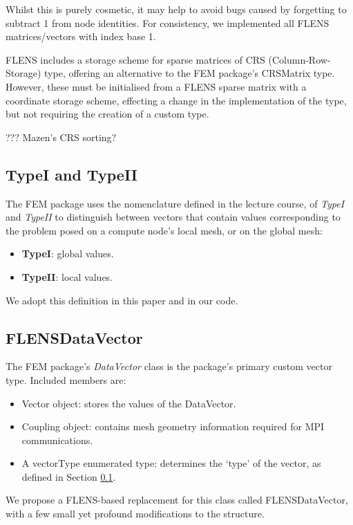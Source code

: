 Whilst this is purely cosmetic, it may help to avoid bugs caused by forgetting to subtract 1 from node identities. For consistency, we implemented all FLENS matrices/vectors with index base 1.

FLENS includes a storage scheme for sparse matrices of CRS (Column-Row-Storage) type, offering an alternative to the FEM package's CRSMatrix type. However, these must be initialised from a FLENS sparse matrix with a coordinate storage scheme, effecting a change in the implementation of the type, but not requiring the creation of a custom type.

??? Mazen's CRS sorting?

\subsection{TypeI and TypeII}\label{subsc:typeI_II}

The FEM package uses the nomenclature defined in the lecture course, of \emph{TypeI} and \emph{TypeII} to distinguish between vectors that contain values corresponding to the problem posed on a compute node's local mesh, or on the global mesh:

\begin {itemize}
   \item \textbf{TypeI}: global values.
   \item \textbf{TypeII}: local values.
\end{itemize}

We adopt this definition in this paper and in our code.

\subsection{FLENSDataVector}

The FEM package's \emph{DataVector} class is the package's primary custom vector type. Included members are:
\begin{itemize}
   \item Vector object: stores the values of the DataVector.
   \item Coupling object: contains mesh geometry information required for MPI communications.
   \item A vectorType enumerated type: determines the `type' of the vector, as defined in Section \ref{subsc:typeI_II}.
\end{itemize}

We propose a FLENS-based replacement for this class called FLENSDataVector, with a few small yet profound modifications to the structure.

